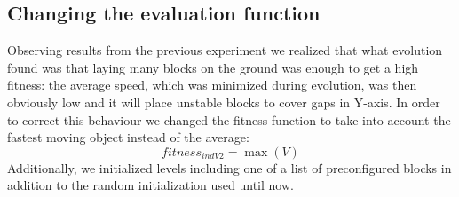 \documentclass[a4paper,twoside]{article}
\begin{document}
\subsection{Changing the evaluation function}\label{E6}

Observing results from the previous experiment we realized that what
evolution found was that laying many blocks on the ground was enough
to get a high fitness: the average speed, which was minimized during
evolution, was then obviously low and it will 
place unstable blocks to cover gaps in Y-axis. In
order to correct this behaviour we changed the 
fitness function to take into account the fastest moving object
instead of the average:
$$fitness_{indV2} = \max{(V)}$$
Additionally, we initialized levels including one of a list of preconfigured
blocks in addition to the random initialization used until
now.
\end{document}

